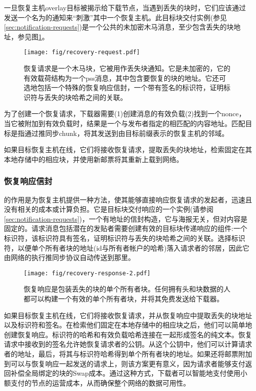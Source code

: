 一旦恢复主机overlay目标被揭示给下载节点，当遇到丢失的块时，它们应该通过发送一个名为的通知来“刺激”其中一个恢复主机。此目标块交付实例(参见\ref{sec:notification-requests})是一个公共的未加密木马消息，至少包含丢失的块地址，参见图\ref{fig:recovery-request}。

\begin{figure}[htbp]
  \centering
  \texttt{[image: fig/recovery-request.pdf]}
  \caption[恢复请求\statusgreen]{恢复请求是一个木马块，它被用作丢失块通知。它是未加密的，它的有效载荷结构为一个pss消息，其中包含要恢复的块的地址。它还可选地包括一个特殊的恢复响应信封，一个带有签名的标识符，证明标识符与丢失的块哈希之间的关联。}
  \label{fig:recovery-request}
\end{figure}

为了创建一个恢复请求，下载器需要(1)创建消息的有效负载(2)找到一个nonce，当它被附加到有效负载时，结果是一个与发布者指定的相匹配的内容地址。匹配目标是指通过推同步chunk，将其发送到由目标前缀表示的恢复主机的邻域。

如果目标恢复主机在线，它们将接收恢复请求，提取丢失的块地址，检索固定在其本地存储中的相应块，并使用新邮票将其重新上载到网络。

\subsubsection{恢复响应信封}

的作用是为恢复主机提供一种方法，使其能够直接响应恢复请求的发起者，迅速且没有相关的成本或计算负担。它是目标块交付响应的一个实例(请参阅\ref{sec:notification-requests})，一个有地址的信封构造，它与海报无关，但对内容是固定的。请求消息包括潜在的发贴者需要创建有效的目标块传递响应的组件:一个标识符，该标识符具有签名，证明标识符与丢失的块哈希之间的关联。选择标识符，以便单个所有者块的地址(id与所有者帐户的哈希)落入请求者的邻居，因此它由网络的执行推同步协议自动传送到那里。

\begin{figure}[htbp]
\centering
\texttt{[image: fig/recovery-response-2.pdf]}
\caption[恢复响应\statusgreen]{恢复响应是包装丢失的块的单个所有者块。任何拥有头和块数据的人都可以构建一个有效的单个所有者块，并将其免费发送给下载器。}
\label{fig:recovery-response}
\end{figure}

如果目标恢复主机在线，它们将接收恢复请求，并从恢复响应中提取丢失的块地址以及标识符和签名。在检索他们固定在本地存储中的相应块之后，他们可以简单地创建恢复响应。标识符的哈希和有效负载哈希连接在一起形成签名的纯文本。恢复请求中接收到的签名允许她恢复请求者的公钥。从这个公钥中，他们可以计算请求者的地址，最后，将其与标识符哈希得到单个所有者块的地址。如果还将邮票附加到可以与恢复响应一起发送的请求上，则该方案更有意义，因为请求者能够支付返回补偿全局绑定的块的Swap成本。通过这种方式，下载者可以智能地支付使用小额支付的节点的运营成本，从而确保整个网络的数据可用性。



